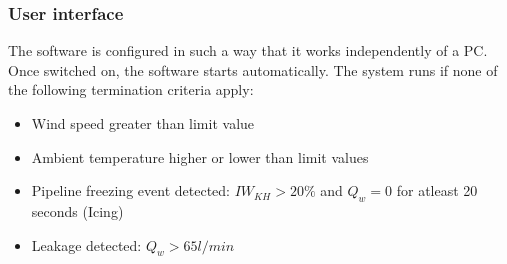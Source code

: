 \documentclass[utf8]{frontiersSCNS}
\begin{document}





\subsubsection{User interface}
The software is configured in such a way that it works independently of a PC. Once switched on, the software
starts automatically. The system runs if none of the following termination criteria apply:

\begin{itemize}
\item Wind speed greater than limit value
\item Ambient temperature higher or lower than limit values
\item Pipeline freezing event detected: $IW_{KH} > 20 \%$ and $Q_w = 0$ for atleast 20 seconds (Icing)
\item Leakage detected: $Q_w > 65 l/min$
\end{itemize}
\end{document}
